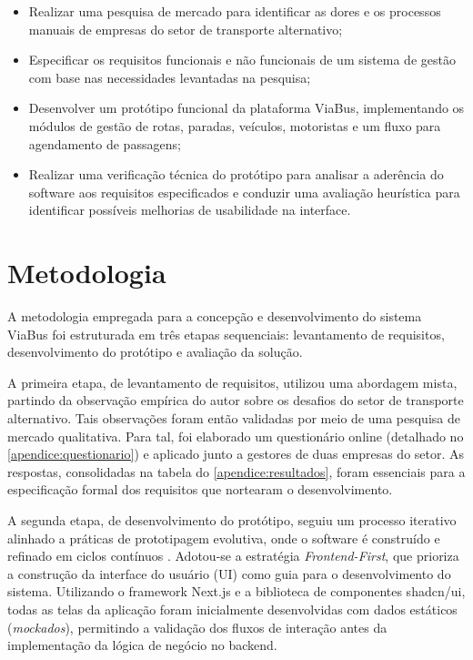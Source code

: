\begin{itemize}
    \item Realizar uma pesquisa de mercado para identificar as dores e os processos manuais de empresas do setor de transporte alternativo;

    \item Especificar os requisitos funcionais e não funcionais de um sistema de gestão com base nas necessidades levantadas na pesquisa;

    \item Desenvolver um protótipo funcional da plataforma ViaBus, implementando os módulos de gestão de rotas, paradas, veículos, motoristas e um fluxo para agendamento de passagens;

    \item Realizar uma verificação técnica do protótipo para analisar a aderência do software aos requisitos especificados e conduzir uma avaliação heurística para identificar possíveis melhorias de usabilidade na interface.
\end{itemize}

\section{Metodologia}

A metodologia empregada para a concepção e desenvolvimento do sistema ViaBus foi estruturada em três etapas sequenciais: levantamento de requisitos, desenvolvimento do protótipo e avaliação da solução.

A primeira etapa, de levantamento de requisitos, utilizou uma abordagem mista, partindo da observação empírica do autor sobre os desafios do setor de transporte alternativo. Tais observações foram então validadas por meio de uma pesquisa de mercado qualitativa. Para tal, foi elaborado um questionário online (detalhado no \autoref{apendice:questionario}) e aplicado junto a gestores de duas empresas do setor. As respostas, consolidadas na tabela do \autoref{apendice:resultados}, foram essenciais para a especificação formal dos requisitos que nortearam o desenvolvimento.

A segunda etapa, de desenvolvimento do protótipo, seguiu um processo iterativo alinhado a práticas de prototipagem evolutiva, onde o software é construído e refinado em ciclos contínuos \cite{sommerville2011software}. Adotou-se a estratégia \textit{Frontend-First}, que prioriza a construção da interface do usuário (UI) como guia para o desenvolvimento do sistema. Utilizando o framework Next.js e a biblioteca de componentes shadcn/ui, todas as telas da aplicação foram inicialmente desenvolvidas com dados estáticos (\textit{mockados}), permitindo a validação dos fluxos de interação antes da implementação da lógica de negócio no backend.

